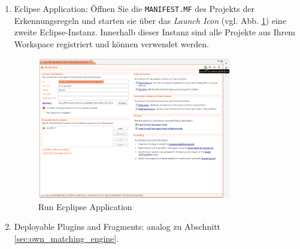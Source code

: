 \documentclass[a4paper]{scrartcl}
\begin{document}
\begin{enumerate}

\item Eclipse Application: 
Öffnen Sie die \texttt{MANIFEST.MF} des Projekts der Erkennungsregeln und starten sie über das \textit{Launch Icon} (vgl. Abb. \ref{eclipse_run_eclipse_application}) eine zweite Eclipse-Instanz. Innerhalb dieser Instanz sind alle Projekte aus Ihrem Workspace registriert und können verwendet werden.

\begin{figure}[H]
\centering
\includegraphics[width=0.8\textwidth]{graphics/eclipse-run_eclipse_application.png}
\caption{Run Ecplipse Application}
\label{eclipse_run_eclipse_application}
\end{figure}


\item Deployable Plugins and Fragments: analog zu Abschnitt \ref{sec:own_matching_engine}.






\end{enumerate}
\end{document}
